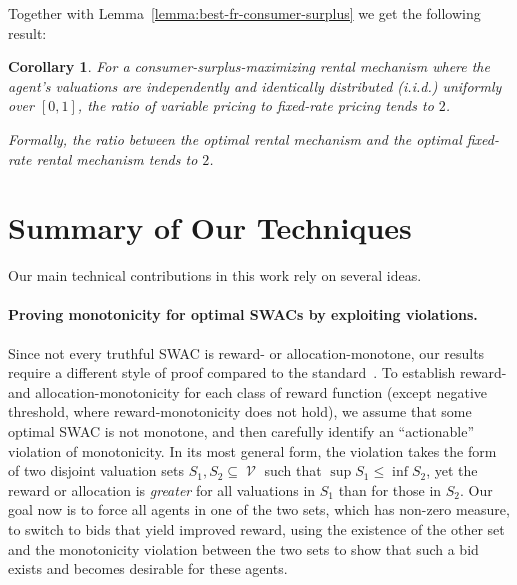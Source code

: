 \documentclass[11pt,letterpaper]{article}
\newcommand{\fr}{fixed-rate\xspace}
\newcommand{\swac}{SWAC\xspace}
\newcommand{\swacs}{SWACs\xspace}
\DeclareMathOperator{\V}{\mathcal{V}}
\theoremstyle{plain}
\newtheorem{corollary}[theorem]{Corollary}
\begin{document}
Together with Lemma~\ref{lemma:best-fr-consumer-surplus} we get the following result:
\begin{corollary}\label{cor:fr-gap}
    For a consumer-surplus-maximizing rental mechanism where the agent's valuations are independently and identically distributed (i.i.d.) uniformly over $[0,1]$, the ratio of variable pricing to \fr pricing tends to $2$.

    Formally, the ratio between the optimal rental mechanism and the optimal \fr rental mechanism tends to $2$.
\end{corollary}






\section{Summary of Our Techniques}
\label{sec:our-techniques}

Our main technical contributions in this work rely on several ideas.

\paragraph{Proving monotonicity for optimal \swacs by exploiting violations.}
Since not every truthful \swac is reward- or allocation-monotone,
our results require a different style of proof compared to the standard~\cite{myerson1981optimal}. 
To establish reward- and allocation-monotonicity
for each class of reward function (except negative threshold, where reward-monotonicity does not hold),
 we assume that some optimal \swac is not monotone, and then carefully identify an ``actionable'' violation of monotonicity.
In its most general form, the violation takes the form of two disjoint valuation sets $S_1, S_2 \subseteq \V$ such that $\sup S_1 \leq \inf S_2$, yet the reward or allocation is \emph{greater} for all valuations in $S_1$ than for those in $S_2$.
Our goal now is to force all agents in one of the two sets, which has non-zero measure, %
to switch to bids that yield improved reward,
 using the existence of the other set and the monotonicity violation between the two sets to show that such a bid exists and becomes desirable for these agents.
\end{document}
